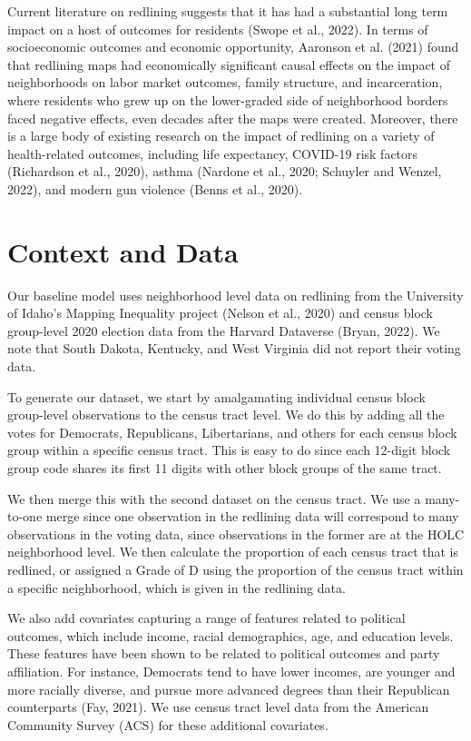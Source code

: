 \documentclass{eco_375_paper}
\begin{document}
Current literature on redlining suggests that it has had a substantial long term impact on a host of outcomes for residents (Swope et al., 2022). In terms of socioeconomic outcomes and economic opportunity, Aaronson et al. (2021) found that redlining maps had economically significant causal effects on the impact of neighborhoods on labor market outcomes, family structure, and incarceration, where residents who grew up on the lower-graded side of neighborhood borders faced negative effects, even decades after the maps were created. Moreover, there is a large body of existing research on the impact of redlining on a variety of health-related outcomes, including life expectancy, COVID-19 risk factors (Richardson et al., 2020), asthma (Nardone et al., 2020; Schuyler and Wenzel, 2022), and modern gun violence (Benns et al., 2020).
\section*{Context and Data}
Our baseline model uses neighborhood level data on redlining from the University of Idaho’s Mapping Inequality project (Nelson et al., 2020) and census block group-level 2020 election data from the Harvard Dataverse (Bryan, 2022). We note that South Dakota, Kentucky, and West Virginia did not report their voting data. 

To generate our dataset, we start by amalgamating individual census block group-level observations to the census tract level. We do this by adding all the votes for Democrats, Republicans, Libertarians, and others for each census block group within a specific census tract. This is easy to do since each 12-digit block group code shares its first 11 digits with other block groups of the same tract.

We then merge this with the second dataset on the census tract. We use a many-to-one merge since one observation in the redlining data will correspond to many observations in the voting data, since observations in the former are at the HOLC neighborhood level. We then calculate the proportion of each census tract that is redlined, or assigned a Grade of D using the proportion of the census tract within a specific neighborhood, which is given in the redlining data.

We also add covariates capturing a range of features related to political outcomes, which include income, racial demographics, age, and education levels. These features have been shown to be related to political outcomes and party affiliation. For instance, Democrats tend to have lower incomes, are younger and more racially diverse, and pursue more advanced degrees than their Republican counterparts (Fay, 2021). We use census tract level data from the American Community Survey (ACS) for these additional covariates.
\end{document}
